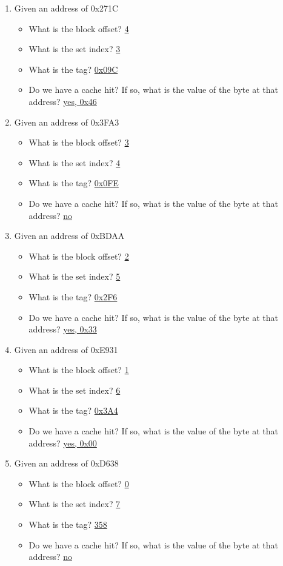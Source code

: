 \documentclass{article}
\begin{document}
\begin{enumerate}
\item Given an address of 0x271C
    \begin{itemize}
    \item What is the block offset? \underline{4}
    \item What is the set index? \underline{3}
    \item What is the tag? \underline{0x09C}
    \item Do we have a cache hit? If so, what is the value of the byte at that address? \underline{yes, 0x46}
    \end{itemize}

\item Given an address of 0x3FA3
    \begin{itemize}
    \item What is the block offset? \underline{3}
    \item What is the set index? \underline{4}
    \item What is the tag? \underline{0x0FE}
    \item Do we have a cache hit? If so, what is the value of the byte at that address? \underline{no}
    \end{itemize}

\item Given an address of 0xBDAA
    \begin{itemize}
    \item What is the block offset? \underline{2}
    \item What is the set index? \underline{5}
    \item What is the tag? \underline{0x2F6}
    \item Do we have a cache hit? If so, what is the value of the byte at that address? \underline{yes, 0x33}
    \end{itemize}

\item Given an address of 0xE931
    \begin{itemize}
    \item What is the block offset? \underline{1}
    \item What is the set index? \underline{6}
    \item What is the tag? \underline{0x3A4}
    \item Do we have a cache hit? If so, what is the value of the byte at that address? \underline{yes, 0x00}
    \end{itemize}

\item Given an address of 0xD638
    \begin{itemize}
    \item What is the block offset? \underline{0}
    \item What is the set index? \underline{7}
    \item What is the tag? \underline{358}
    \item Do we have a cache hit? If so, what is the value of the byte at that address? \underline{no}
    \end{itemize}

\end{enumerate}
\end{document}
